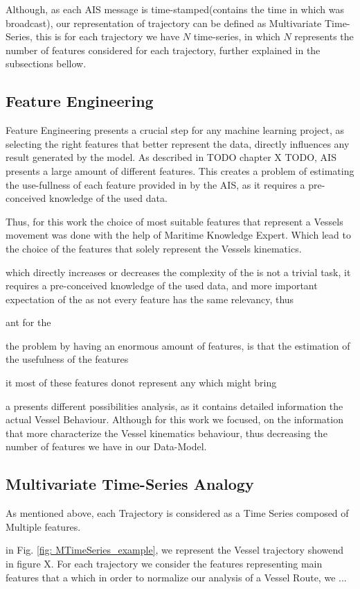 Although, as each AIS message is time-stamped(contains the time in which was broadcast), our representation of trajectory can be defined as Multivariate Time-Series, this is for each trajectory we have $N$ time-series, in which $N$ represents the number of features considered for each trajectory, further explained in the subsections bellow.

\subsection{Feature Engineering}
Feature Engineering presents a crucial step for any machine learning project, as selecting the right features that better represent the data, directly influences any result generated by the model.  
As described in TODO chapter X TODO,  AIS presents a large amount of different features. This creates a problem of estimating the use-fullness of each feature provided in by the AIS, as it requires a pre-conceived knowledge of the used data. 

Thus, for this work the choice of most suitable features that represent a Vessels movement was done with the help of Maritime Knowledge Expert. Which lead to the choice of the features that solely represent the Vessels kinematics.

which directly increases or decreases the complexity of the  is not a trivial task, it requires a pre-conceived knowledge of the used data, and more important expectation of the    as not every feature has the same relevancy, thus 

ant for the 

the problem by having an enormous amount of features,  is that the estimation of the usefulness of the features 

it most of these features donot represent any which might bring 

a presents different possibilities analysis, as it contains detailed information the actual Vessel Behaviour. Although for this work we focused, on the information that more characterize the Vessel kinematics behaviour, thus decreasing the number of features we have in our Data-Model.

\subsection{Multivariate Time-Series Analogy}
As mentioned above, each Trajectory is considered as a Time Series composed of Multiple features.  

in Fig. \ref{fig: MTimeSeries_example}, we represent the Vessel trajectory showend in figure X. 
For each trajectory we consider the features representing 
main features that a which in order to normalize our analysis of a Vessel Route, we ...

